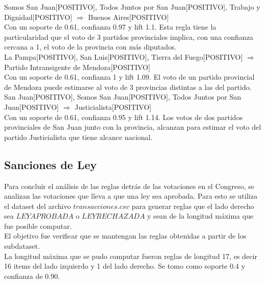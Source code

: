 \documentclass{endm}
\begin{document}
{Somos San Juan[POSITIVO],                      Todos Juntos por San Juan[POSITIVO],            Trabajo y Dignidad[POSITIVO]}   $\Longrightarrow$ {Buenos Aires[POSITIVO]} \\

Con un soporte de 0.61, confianza 0.97 y lift 1.1. Esta regla tiene la particularidad que el voto de 3 partidos provinciales implica, con una confianza cercana a 1, el voto de la provincia con más diputados. \\

{La Pampa[POSITIVO],                            San Luis[POSITIVO],                             Tierra del Fuego[POSITIVO]}  $\Longrightarrow$ {Partido Intransigente de Mendoza[POSITIVO]} \\

Con un soporte de 0.61, confianza 1 y lift 1.09. El voto de un partido provincial de Mendoza puede estimarse al voto de 3 provincias distintas a las del partido.\\


{San Juan[POSITIVO],                            Somos San Juan[POSITIVO],                       Todos Juntos por San Juan[POSITIVO]}    $\Longrightarrow$ {Justicialista[POSITIVO]}  \\

Con un soporte de 0.61, confianza 0.95 y lift 1.14. Los votos de dos partidos provinciales de San Juan junto con la provincia, alcanzan para estimar el voto del partido Justicialista que tiene alcance nacional. \\

\subsection{Sanciones de Ley}

Para concluir el análisis de las reglas detrás de las votaciones en el Congreso, se analizan las votaciones que lleva a que una ley sea aprobada. Para esto se utiliza el dataset del archivo $transacciones.csv$ para generar reglas que el lado derecho sea $LEYAPROBADA$ o $LEYRECHAZADA$ y sean de la longitud máxima que fue posible computar. \\

El objetivo fue verificar que se mantengan las reglas obtenidas a partir de los subdataset.  \\

La longitud máxima que se pudo computar fueron reglas de longitud 17, es decir 16 items del lado izquierdo y 1 del lado derecho. Se tomo como soporte 0.4 y confianza de 0.90.  \\
\end{document}
